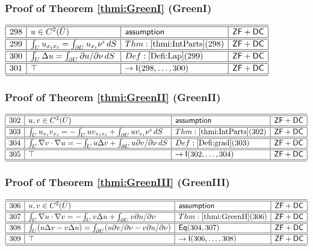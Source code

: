 \documentclass[11pt,reqno]{amsart}
\begin{document}
\medskip

\subsubsection*{Proof of Theorem \ref{thmi:GreenI} (\textsf{GreenI})}

\noindent$%
\begin{array}{|r|l|l|l|}
\hline\hline
298 & u\in C^{2}(\bar{U}) & \mathsf{assumption} & \mathsf{ZF+DC} \\ \hline\hline
299 & \int_{U}u_{x_{i}x_{i}}=\int_{\partial U}u_{x_{i}}\nu^{i}\,dS & Thm:\ref{thmi:IntParts}(298) & \mathsf{ZF+DC} \\ \hline\hline
300 & \int_{U}\Delta u=\int_{\partial U}\partial u/\partial\nu\,dS & Def:\ref{Defi:Lap}(299) & \mathsf{ZF+DC} \\ \hline\hline
301 & \top & \to\mathsf{I}(298,\dots,300) & \mathsf{ZF+DC} \\ \hline\hline
\end{array}%
$

\medskip

\subsubsection*{Proof of Theorem \ref{thmi:GreenII} (\textsf{GreenII})}

\noindent$%
\begin{array}{|r|l|l|l|}
\hline\hline
302 & u,v\in C^{2}(\bar{U}) & \mathsf{assumption} & \mathsf{ZF+DC} \\ \hline\hline
303 & \int_{U}u_{x_{i}}v_{x_{i}}=-\int_{U}uv_{x_{i}x_{i}}+\int_{\partial U}uv_{x_{i}}\nu^{i}\,dS & Thm:\ref{thmi:IntParts}(302) & \mathsf{ZF+DC} \\ \hline\hline
304 & \int_{U}\nabla v\cdot\nabla u=-\int_{U}u\Delta v+\int_{\partial U}u\partial v/\partial\nu\,dS & Def:\ref{Defi:grad}(303) & \mathsf{ZF+DC} \\ \hline\hline
305 & \top & \to\mathsf{I}(302,\dots,304) & \mathsf{ZF+DC} \\ \hline\hline
\end{array}%
$

\medskip

\subsubsection*{Proof of Theorem \ref{thmi:GreenIII} (\textsf{GreenIII})}

\noindent$%
\begin{array}{|r|l|l|l|}
\hline\hline
306 & u,v\in C^{2}(\bar{U}) & \mathsf{assumption} & \mathsf{ZF+DC} \\ \hline\hline
307 & \int_{U}\nabla u\cdot\nabla v=-\int_{U}v\Delta u+\int_{\partial U}v\partial u/\partial\nu & Thm:\ref{thmi:GreenII}(306) & \mathsf{ZF+DC} \\ \hline\hline
308 & \int_{U}(u\Delta v-v\Delta u)=\int_{\partial U}(u\partial v/\partial\nu-v\partial u/\partial\nu) & \mathsf{Eq}(304,307) & \mathsf{ZF+DC} \\ \hline\hline
309 & \top & \to\mathsf{I}(306,\dots,308) & \mathsf{ZF+DC} \\ \hline\hline
\end{array}%
$
\end{document}
